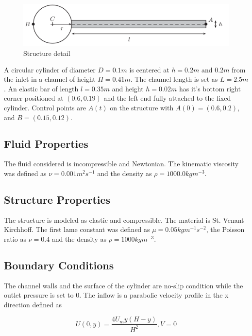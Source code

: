\documentclass{article}
\begin{document}
\FloatBarrier
\begin{figure}[h]
\centering
	\includegraphics[width=\textwidth]{struct_geom}
	\caption{Structure detail \cite{turek2006proposal}}
	\label{fig:structre}
\end{figure}
\FloatBarrier

A circular cylinder of diameter $D = 0.1 m$ is centered at $h = 0.2 m$ and $0.2 m$ from the inlet in a channel of height $H = 0.41 m$. The channel length is set as $L = 2.5 m$. An elastic bar of length $l = 0.35 m$ and height $h = 0.02 m$ has it's bottom right corner positioned at $(0.6, 0.19)$ and the left end fully attached to the fixed cylinder. Control points are $A(t)$ on the structure with $A(0) = (0.6, 0.2)$, and $B = (0.15, 0.12)$. 

\subsection{Fluid Properties}
The fluid considered is incompressible and Newtonian. The kinematic viscosity was defined as $\nu = 0.001 m^2s^{-1}$ and the density as $ \rho = 1000.0 kg m^{-3}$. 

\subsection{Structure Properties}
The structure is modeled as elastic and compressible. The material is St. Venant-Kirchhoff. The first lame constant was defined as $\mu = 0.05 kg m^{-1}s^{-2}$, the Poisson ratio as $\nu = 0.4$ and the density as $\rho = 1000 kg m^{-3}$.

\subsection{Boundary Conditions}
The channel walls and the surface of the cylinder are no-slip condition while the outlet pressure is set to 0. The inflow is a parabolic velocity profile in the x direction defined as 

\begin{equation}
U(0, y) = \frac{4 U_m y (H - y)}{H^2} , V = 0
\end{equation}
\end{document}
